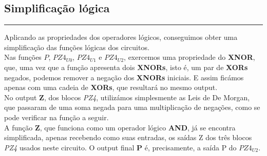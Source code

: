 \documentclass[12pt]{article}
\begin{document}
\newpage
\subsection{Simplificação lógica}
\noindent\rule[1.2cm]{3.35in}{.1mm}
\vspace{-0.5cm}

Aplicando as propriedades dos operadores lógicos, conseguimos obter uma simplificação das funções lógicas dos circuitos. \\

Nas funções $P$, $PZ4_{U0}$, $PZ4_{U1}$ e $PZ4_{U2}$, exercemos uma propriedade do \textbf{XNOR}, que, uma vez que a função apresenta dois \textbf{XNORs}, isto é, um par de \textbf{XORs} negados, podemos remover a negação dos \textbf{XNORs} iniciais. E assim ficámos apenas com uma cadeia de \textbf{XORs}, que resultará no mesmo output. \\

No output \textbf{Z}, dos blocos \textit{PZ4}, utilizámos simplesmente as Leis de De Morgan, que passaram de uma soma negada para uma multiplicação de negações, como se pode verificar na função a seguir. \\

A função \textbf{Z}, que funciona como um operador lógico \textbf{AND}, já se encontra simplificada, apenas recebendo como suas entradas, os saídas Z dos três blocos \textit{PZ4} usados neste circuito. O output final \textbf{P} é, precisamente, a saída P do $PZ4_{U2}$.

\vspace{1cm}
\noindent{}
\end{document}
